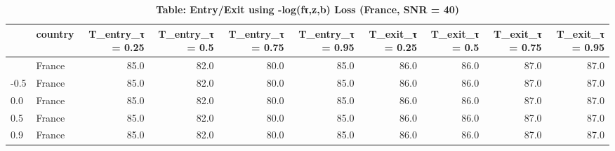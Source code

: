 \begin{table}[t]
\caption*{
{\large \textbf{Table: Entry/Exit using -log(fτ,z,b) Loss (France, SNR = 40)}}
} 
\begin{tabular*}{\linewidth}{@{\extracolsep{\fill}}l|lrrrrrrrr}
\toprule
 & country & T\_entry\_τ = 0.25 & T\_entry\_τ = 0.5 & T\_entry\_τ = 0.75 & T\_entry\_τ = 0.95 & T\_exit\_τ = 0.25 & T\_exit\_τ = 0.5 & T\_exit\_τ = 0.75 & T\_exit\_τ = 0.95 \\ 
\midrule\addlinespace[2.5pt]
-0.9 & France & 85.0 & 82.0 & 80.0 & 85.0 & 86.0 & 86.0 & 87.0 & 87.0 \\ 
-0.5 & France & 85.0 & 82.0 & 80.0 & 85.0 & 86.0 & 86.0 & 87.0 & 87.0 \\ 
0.0 & France & 85.0 & 82.0 & 80.0 & 85.0 & 86.0 & 86.0 & 87.0 & 87.0 \\ 
0.5 & France & 85.0 & 82.0 & 80.0 & 85.0 & 86.0 & 86.0 & 87.0 & 87.0 \\ 
0.9 & France & 85.0 & 82.0 & 80.0 & 85.0 & 86.0 & 86.0 & 87.0 & 87.0 \\ 
\bottomrule
\end{tabular*}
\end{table}

